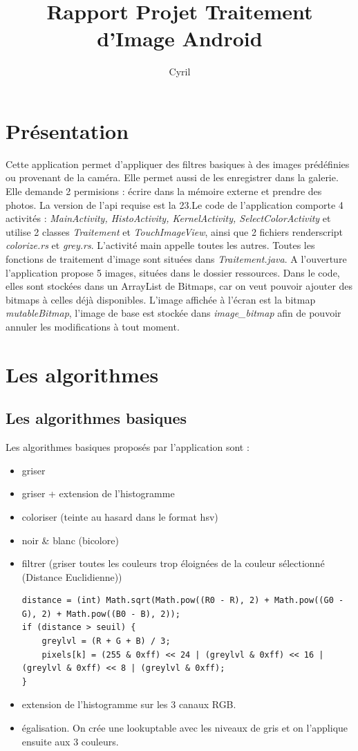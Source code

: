 \documentclass[a4paper, 12pt]{report}
\title{Rapport Projet Traitement d'Image Android}
\author{Cyril \bsc {CAULONQUE}}
\date {}
\begin{document}
\maketitle
\newpage
    \tableofcontents
\newpage
\section{Présentation}
Cette application permet d'appliquer des filtres basiques à des images prédéfinies ou provenant de la caméra. Elle permet aussi de les enregistrer dans la galerie. Elle demande 2 permisions : écrire dans la mémoire externe et prendre des photos. La version de l'api requise est la 23.\newline Le code de l'application comporte 4 activités : \emph{MainActivity, HistoActivity, KernelActivity, SelectColorActivity} et utilise 2 classes \emph{Traitement} et \emph{TouchImageView}, ainsi que 2 fichiers renderscript \emph{colorize.rs} et \emph{grey.rs}.\newline
L'activité main appelle toutes les autres. Toutes les fonctions de traitement d'image sont situées dans \emph{Traitement.java}.
A l'ouverture l'application propose 5 images, situées dans le dossier ressources. Dans le code, elles sont stockées dans un ArrayList de Bitmaps, car on veut pouvoir ajouter des bitmaps à celles déjà disponibles. L'image affichée à l'écran est la bitmap \emph{mutableBitmap}, l'image de base est stockée dans \emph{image\_bitmap} afin de pouvoir annuler les modifications à tout moment.
\section{Les algorithmes}
\subsection{Les algorithmes basiques}
Les algorithmes basiques proposés par l'application sont :\newline
\begin{itemize}
\item griser
\item griser + extension de l'histogramme
\item coloriser (teinte au hasard dans le format hsv)
\item noir \& blanc (bicolore)
\item filtrer (griser toutes les couleurs trop éloignées de la couleur sélectionné (Distance Euclidienne))
\begin{lstlisting}[frame=single]
distance = (int) Math.sqrt(Math.pow((R0 - R), 2) + Math.pow((G0 - G), 2) + Math.pow((B0 - B), 2));
if (distance > seuil) {
    greylvl = (R + G + B) / 3;
    pixels[k] = (255 & 0xff) << 24 | (greylvl & 0xff) << 16 | (greylvl & 0xff) << 8 | (greylvl & 0xff);
}
\end{lstlisting}
\item extension de l'histogramme sur les 3 canaux RGB.
\item égalisation. On crée une lookuptable avec les niveaux de gris et on l'applique ensuite aux 3 couleurs.
\end {itemize}
\end{document}
